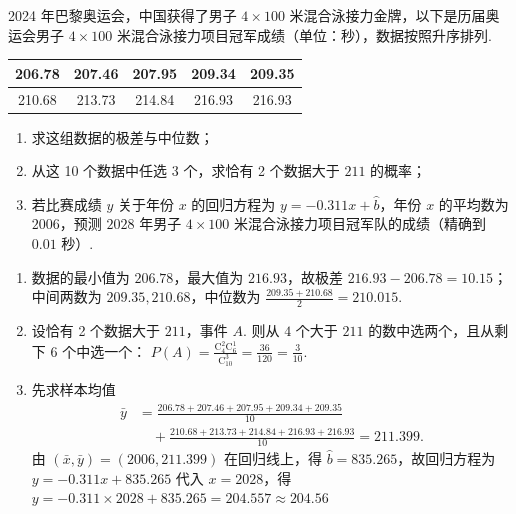 \begin{problem}
2024 年巴黎奥运会，中国获得了男子 \(4\times100\) 米混合泳接力金牌，以下是历届奥运会男子 \(4\times100\) 米混合泳接力项目冠军成绩（单位：秒），数据按照升序排列.

\begin{center}
\begin{tabular}{|c|c|c|c|c|}
\hline
206.78 & 207.46 & 207.95 & 209.34 & 209.35 \\
\hline
210.68 & 213.73 & 214.84 & 216.93 & 216.93 \\
\hline
\end{tabular}
\end{center}

\begin{enumerate}
\item 求这组数据的极差与中位数；
\item 从这 10 个数据中任选 3 个，求恰有 2 个数据大于 \(211\) 的概率；
\item 若比赛成绩 \(y\) 关于年份 \(x\) 的回归方程为 \(y=-0.311x+\hat b\)，年份 \(x\) 的平均数为 \(2006\)，预测 \(2028\) 年男子 \(4\times100\) 米混合泳接力项目冠军队的成绩（精确到 \(0.01\) 秒）.
\end{enumerate}
\end{problem}

\begin{solution}
\begin{enumerate}
\item 数据的最小值为 \(206.78\)，最大值为 \(216.93\)，故极差 \(216.93-206.78=10.15\)；中间两数为 \(209.35,210.68\)，中位数为 \(\frac{209.35+210.68}{2}=210.015\).

\item 设恰有 2 个数据大于 \(211\)，事件 \(A\). 则从 \(4\) 个大于 \(211\) 的数中选两个，且从剩下 \(6\) 个中选一个：
\(P(A)=\frac{\mathrm C_4^2\mathrm C_6^1}{\mathrm C_{10}^3}=\frac{36}{120}=\frac3{10}\).

\item 先求样本均值
\[
\begin{aligned}
\bar y
&=\frac{206.78+207.46+207.95+209.34+209.35}{10}\\
&\quad+\frac{210.68+213.73+214.84+216.93+216.93}{10}=211.399.
\end{aligned}
\]
由 \((\bar x,\bar y)=(2006,211.399)\) 在回归线上，得 \(\hat b=835.265\)，故回归方程为
\(
y=-0.311x+835.265
\)
代入 \(x=2028\)，得
\(
y=-0.311\times2028+835.265 =204.557\approx204.56
\)
\end{enumerate}
\end{solution}

